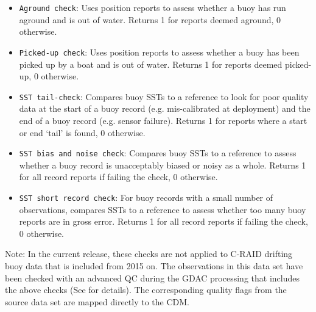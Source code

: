 {\begin{itemize}[resume]
\item \texttt{Aground check}: Uses position reports to assess whether a buoy has run aground and is out of water. Returns 1 for reports deemed aground, 0 otherwise.
\item \texttt{Picked-up check}: Uses position reports to assess whether a buoy has been picked up by a boat and is out of water. Returns 1 for reports deemed picked-up, 0 otherwise. 
\item \texttt{SST tail-check}: Compares buoy SSTs to a reference to look for poor quality data at the start of a buoy record (e.g. mis-calibrated at deployment) and the end of a buoy record (e.g. sensor failure). Returns 1 for reports where a start or end ‘tail’ is found, 0 otherwise.  
\item \texttt{SST bias and noise check}: Compares buoy SSTs to a reference to assess whether a buoy record is unacceptably biased or noisy as a whole. Returns 1 for all record reports if failing the check, 0 otherwise.
\item \texttt{SST short record check}: For buoy records with a small number of observations, compares SSTs to a reference to assess whether too many buoy reports are in gross error. Returns 1 for all record reports if failing the check, 0 otherwise.    
\end{itemize}

Note: In the current release, these checks are not applied to C-RAID drifting buoy data that is included from 2015 on. 
The observations in this data set have been checked with an advanced QC during the GDAC processing that includes the above checks (See \cite{craidQCManual} for details).
The corresponding quality flags from the source data set are mapped directly to the CDM.

}
